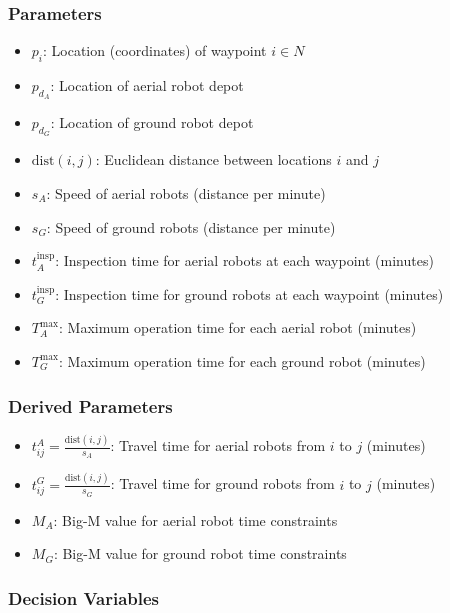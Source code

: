 \documentclass{article}
\begin{document}
			\subsubsection{Parameters}

				\begin{itemize}
				\item $p_i$: Location (coordinates) of waypoint $i \in N$
				\item $p_{d_A}$: Location of aerial robot depot
				\item $p_{d_G}$: Location of ground robot depot
				\item $\text{dist}(i,j)$: Euclidean distance between locations $i$ and $j$
				\item $s_A$: Speed of aerial robots (distance per minute)
				\item $s_G$: Speed of ground robots (distance per minute)
				\item $t_A^{\text{insp}}$: Inspection time for aerial robots at each waypoint (minutes)
				\item $t_G^{\text{insp}}$: Inspection time for ground robots at each waypoint (minutes)
				\item $T_A^{\max}$: Maximum operation time for each aerial robot (minutes)
				\item $T_G^{\max}$: Maximum operation time for each ground robot (minutes)
				\end{itemize}

			\subsubsection{Derived Parameters}

				\begin{itemize}
				\item $t_{ij}^{A} = \frac{\text{dist}(i,j)}{s_A}$: Travel time for aerial robots from $i$ to $j$ (minutes)
				\item $t_{ij}^{G} = \frac{\text{dist}(i,j)}{s_G}$: Travel time for ground robots from $i$ to $j$ (minutes)
				\item $M_A$: Big-M value for aerial robot time constraints
				\item $M_G$: Big-M value for ground robot time constraints
				\end{itemize}

			\subsubsection{Decision Variables}
\end{document}
